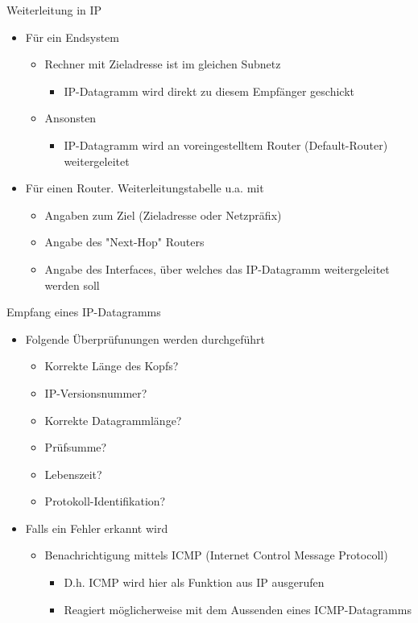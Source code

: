       Weiterleitung in IP
      \begin{itemize}
        \item Für ein Endsystem
          \begin{itemize}
            \item Rechner mit Zieladresse ist im gleichen Subnetz
              \begin{itemize}
                \item IP-Datagramm wird direkt zu diesem Empfänger geschickt
              \end{itemize}
            \item Ansonsten
              \begin{itemize}
                \item IP-Datagramm wird an voreingestelltem Router (Default-Router) weitergeleitet
              \end{itemize}
          \end{itemize}
        \item Für einen Router. Weiterleitungstabelle u.a. mit
          \begin{itemize}
            \item Angaben zum Ziel (Zieladresse oder Netzpräfix)
            \item Angabe des "Next-Hop" Routers
            \item Angabe des Interfaces, über welches das IP-Datagramm weitergeleitet werden soll
          \end{itemize}
      \end{itemize}
      Empfang eines IP-Datagramms
      \begin{itemize}
        \item Folgende Überprüfunungen werden durchgeführt
          \begin{itemize}
            \item Korrekte Länge des Kopfs?
            \item IP-Versionsnummer?
            \item Korrekte Datagrammlänge?
            \item Prüfsumme?
            \item Lebenszeit?
            \item Protokoll-Identifikation?
          \end{itemize}
        \item Falls ein Fehler erkannt wird
          \begin{itemize}
            \item Benachrichtigung mittels ICMP (Internet Control Message Protocoll)
              \begin{itemize}
                \item D.h. ICMP wird hier als Funktion aus IP ausgerufen
                \item Reagiert möglicherweise mit dem Aussenden eines ICMP-Datagramms
              \end{itemize}
          \end{itemize}
      \end{itemize}
